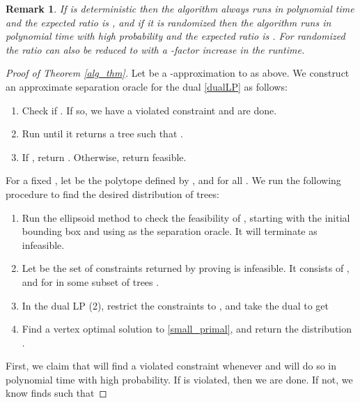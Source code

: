 \documentclass[11pt]{article}
\newtheorem{rem}[thm]{Remark}
\begin{document}
\begin{rem} If  is deterministic then the algorithm always runs in polynomial time and the expected ratio is , and if it is randomized then the algorithm runs in polynomial time with high probability and the expected ratio is .  For randomized  the ratio can also be reduced to  with a -factor increase in the runtime.
\end{rem}

\begin{proof}[Proof of Theorem \ref{alg_thm}]

Let  be a -approximation to  as above.  We construct an approximate separation oracle  for the dual \eqref{dualLP} as follows:

\begin{enumerate}

\item Check if .  If so, we have a violated constraint and are done.

\item \label{find_tree_step} Run  until it returns a tree  such that .

\item If , return .  Otherwise, return feasible.

\end{enumerate}

For a fixed , let  be the polytope defined by , and  for all .  We run the following procedure to find the desired distribution of trees:

\begin{enumerate}

\item Run the ellipsoid method to check the feasibility of , starting with the initial bounding box   and using  as the separation oracle.  It will terminate as infeasible.

\item Let  be the set of constraints returned by  proving  is infeasible.  It consists of , and  for  in some subset of trees .

\item In the dual LP (2), restrict the constraints to , and take the dual to get


\item Find a vertex optimal solution to \eqref{small_primal}, and return the distribution .
\end{enumerate}

First, we claim that  will find a violated constraint whenever  and will do so in polynomial time with high probability.  If   is violated, then we are done.  If not, we know  finds  such that 


\end{proof}
\end{document}
